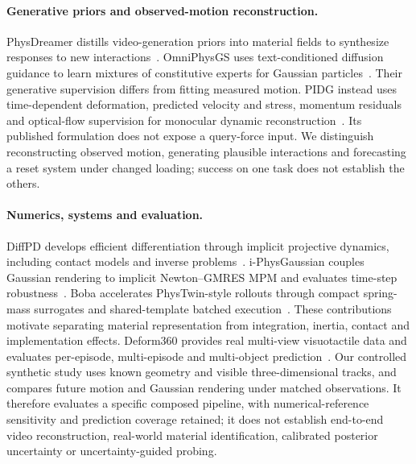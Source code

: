 \paragraph{Generative priors and observed-motion reconstruction.}
PhysDreamer distills video-generation priors into material fields to synthesize
responses to new interactions~\cite{zhang2024physdreamer}. OmniPhysGS uses
text-conditioned diffusion guidance to learn mixtures of constitutive experts
for Gaussian particles~\cite{lin2025omniphysgs}. Their generative supervision
differs from fitting measured motion. PIDG instead uses time-dependent
deformation, predicted velocity and stress, momentum residuals and optical-flow
supervision for monocular dynamic reconstruction~\cite{hong2026pidg}. Its
published formulation does not expose a query-force input. We distinguish
reconstructing observed motion, generating plausible interactions and forecasting
a reset system under changed loading; success on one task does not establish
the others.

\paragraph{Numerics, systems and evaluation.}
DiffPD develops efficient differentiation through implicit projective dynamics,
including contact models and inverse problems~\cite{du2022diffpd}.
i-PhysGaussian couples Gaussian rendering to implicit Newton--GMRES MPM and
evaluates time-step robustness~\cite{cao2026iphysgaussian}. Boba accelerates
PhysTwin-style rollouts through compact spring-mass surrogates and shared-template
batched execution~\cite{pang2026boba}. These contributions motivate separating
material representation from integration, inertia, contact and implementation
effects. Deform360 provides real multi-view visuotactile data and evaluates
per-episode, multi-episode and multi-object prediction~\cite{li2026deform360}.
Our controlled synthetic study uses known geometry and visible three-dimensional
tracks, and compares future motion and Gaussian rendering under matched
observations. It therefore evaluates a specific composed pipeline, with
numerical-reference sensitivity and prediction coverage retained; it does not
establish end-to-end video reconstruction, real-world material identification,
calibrated posterior uncertainty or uncertainty-guided probing.
